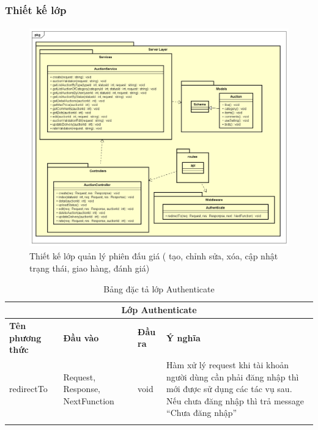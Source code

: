 \documentclass{article}
\begin{document}
\subsubsection{Thiết kế lớp}
\begin{figure}[H]
    \centering
    \includegraphics[width=11.4cm,height=9.54cm]{images/detailclass.png}
    \caption{Thiết kế lớp quản lý phiên đấu giá ( tạo, chỉnh sửa, xóa, cập nhật trạng thái, giao hàng, đánh giá)}
    \label{hinh412}
\end{figure}
\newpage
    \begin{longtable}{| p{} | p{} | p{} | p{} |} 
    \hline
        \multicolumn{4}{|c|}{Lớp Authenticate}\\\hline
        \bfseries Tên phương thức & \bfseries Đầu vào & \bfseries Đầu ra & \bfseries Ý nghĩa  \\\hline
        redirectTo & Request, Response, NextFunction & void & Hàm xử lý request khi tài khoản người dùng cần phải đăng nhập thì mới được sử dụng các tác vụ sau. Nếu chưa đăng nhập thì trả message “Chưa đăng nhập”\\\hline
    \caption{Bảng đặc tả lớp Authenticate}
    \label{bang43}
    \end{longtable}
\end{document}

